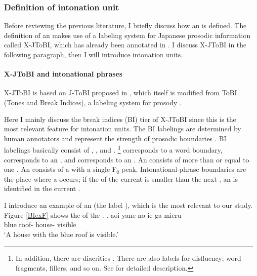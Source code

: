 \subsubsection{Definition of intonation unit}

Before reviewing the previous literature,
I briefly discuss how an  is defined.
The definition of an  makes use of a labeling system for Japanese prosodic information called X-JToBI,
which has already been annotated in .
I discuss X-JToBI in the following paragraph, then I will introduce intonation units.

\paragraph{X-JToBI and intonational phrases}

X-JToBI \cite{maekawaetal02,igarashietal06} is based on J-ToBI proposed in ,
which itself is modified from ToBI (Tones and Break Indices), a labeling system for  prosody \cite{silvermanetal92,pitrellietal94,beckmanelam97}.%

Here I mainly discuss the break indices (BI) tier of X-JToBI
since this is the most relevant feature for intonation units.
The BI labelings are determined by human annotators and represent the strength of prosodic boundaries \cite{maekawaetal02,igarashietal06}.
BI labelings basically consist of , , and .%
	\footnote{
	In addition, there are diacritics .
	There are also labels for disfluency;
	word fragments, fillers, and so on.
	See  for detailed description.
	}
 corresponds to a word boundary,
 corresponds to an , and
 corresponds to an .
An  consists of more than or equal to one .
An  consists of a  with a single F$_{0}$ peak.
Intonational-phrase boundaries are the place where a  occurs;
if the  of the current  is smaller than the next ,
an  is identified in the current .

I introduce an example of an  (the label ),
which is the most relevant to our study.
Figure \ref{BIexF} shows the  of the  \Next.
%
\exg. aoi yane-no ie-ga mieru \\
	blue roof- house- visible \\
	`A house with the blue roof is visible.'

